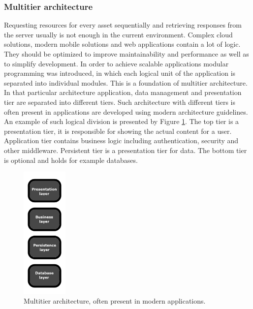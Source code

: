 \documentclass{article} %
\begin{document}
\subsubsection{Multitier architecture}
Requesting resources for every asset sequentially and retrieving responses from the server usually is not enough in the current environment. Complex cloud solutions, modern mobile solutions and web applications contain a lot of logic. They should be optimized to improve maintainability and performance as well as to simplify development. In order to achieve scalable applications modular programming was introduced, in which each logical unit of the application is separated into individual modules. This is a foundation of multitier architecture. In that particular architecture application, data management and presentation tier are separated into
different tiers. Such architecture with different tiers is often present in applications are developed using modern architecture guidelines. An example of such logical division is presented by Figure \ref{fig:multitier_architecture}. The top tier is a presentation tier, it is responsible for showing the actual content for a user. Application tier contains business logic including authentication, security and other middleware. Persistent tier is a presentation tier for data. The bottom tier is optional and holds for example databases.
\begin{figure}[ht]
  \centering
      \includegraphics[width=0.2\textwidth]{layers.png}
  \caption{Multitier architecture, often present in modern applications.}
  \label{fig:multitier_architecture}
\end{figure}
\newpage
\end{document}
